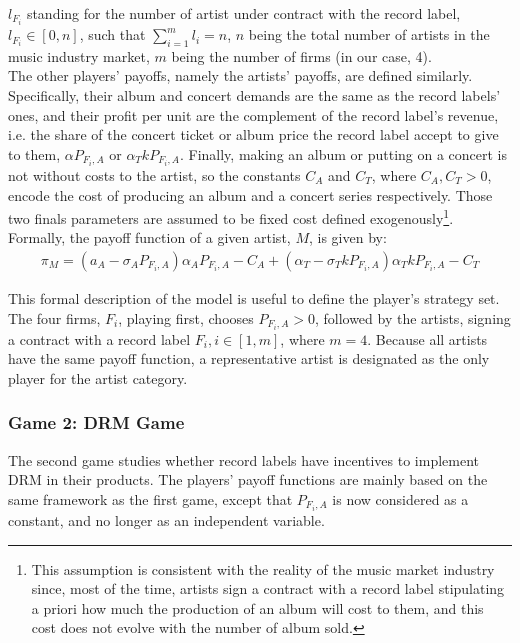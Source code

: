 \documentclass[letter,12pt]{article}
\numberwithin{equation}{section}
\begin{document}
$l_{F_i}$ standing for the number of artist under contract with the record label, $l_{F_i} \in [0, n]$, such that $\sum_{i = 1}^m l_i = n$, $n$ being the total number of artists in the music industry market, $m$ being the number of firms (in our case, 4).\\

The other players’ payoffs, namely the artists’ payoffs, are defined similarly. Specifically, their album and concert demands are the same as the record labels’ ones, and their profit per unit are the complement of the record label’s revenue, i.e. the share of the concert ticket or album price the record label accept to give to them, $\alpha P_{F_i, A}$ or $\alpha_T k P_{F_i, A}$. Finally, making an album or putting on a concert is not without costs to the artist, so the constants $C_A$ and $C_T$, where $C_A, C_T > 0$,  encode the cost of producing an album and a concert series respectively. Those two finals parameters are assumed to be fixed cost defined exogenously\footnote{
This assumption is consistent with the reality of the music market industry since, most of the time, artists sign a contract with a record label stipulating a priori how much the production of an album will cost to them, and this cost does not evolve with the number of album sold.
}. Formally, the payoff function of a given artist, $M$, is given by:
\begin{eqnarray}
\pi_M = (a_A - \sigma_A P_{F_i, A})\alpha_A P_{F_i, A} - C_A
	+ (\alpha_T - \sigma_T k P_{F_i, A}) \alpha_T k P_{F_i, A} - C_T
\end{eqnarray}

This formal description of the model is useful to define the player’s strategy set. The four firms, $F_i$, playing first, chooses $P_{F_i, A} > 0$, followed by the artists, signing a contract with a record label $F_i, i \in [1, m]$, where $m = 4$. Because all artists have the same payoff function, a representative artist is designated as the only player for the artist category. 

\subsubsection{Game 2: DRM Game}

The second game studies whether record labels have incentives to implement DRM in their products. The players’ payoff functions are mainly based on the same framework as the first game, except that $P_{F_i, A}$ is now considered as a constant, and no longer as an independent variable.\\
\end{document}
